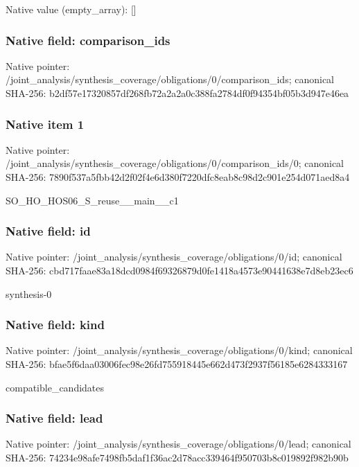 \documentclass[10pt,a4paper]{article}
\begin{document}
Native value (empty\_\allowbreak{}array): []

\subsubsection{Native field: comparison\_\allowbreak{}ids}
Native pointer: /joint\_\allowbreak{}analysis/synthesis\_\allowbreak{}coverage/obligations/0/comparison\_\allowbreak{}ids; canonical SHA-256: b2df57e17320857df268fb72a2a2a0c388fa2784df0f94354bf05b3d947e46ea

\subsubsection{Native item 1}
Native pointer: /joint\_\allowbreak{}analysis/synthesis\_\allowbreak{}coverage/obligations/0/comparison\_\allowbreak{}ids/0; canonical SHA-256: 7890f537a5fbb42d2f02f4e6d380f7220dfc8eab8c98d2c901e254d071aed8a4

\begingroup\raggedright\sloppy SO\_\allowbreak{}HO\_\allowbreak{}HOS06\_\allowbreak{}S\_\allowbreak{}reuse\_\allowbreak{}\_\allowbreak{}main\_\allowbreak{}\_\allowbreak{}c1\par\endgroup

\subsubsection{Native field: id}
Native pointer: /joint\_\allowbreak{}analysis/synthesis\_\allowbreak{}coverage/obligations/0/id; canonical SHA-256: cbd717faae83a18dcd0984f69326879d0fe1418a4573e90441638e7d8eb23ec6

\begingroup\raggedright\sloppy synthesis-0\par\endgroup

\subsubsection{Native field: kind}
Native pointer: /joint\_\allowbreak{}analysis/synthesis\_\allowbreak{}coverage/obligations/0/kind; canonical SHA-256: bfae5f6daa03006fec98e26fd755918445e662d473f2937f56185e6284333167

\begingroup\raggedright\sloppy compatible\_\allowbreak{}candidates\par\endgroup

\subsubsection{Native field: lead}
Native pointer: /joint\_\allowbreak{}analysis/synthesis\_\allowbreak{}coverage/obligations/0/lead; canonical SHA-256: 74234e98afe7498fb5daf1f36ac2d78acc339464f950703b8c019892f982b90b
\end{document}
